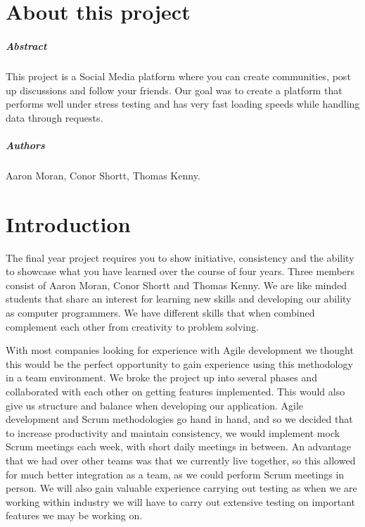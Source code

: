 
\chapter*{About this project}
\paragraph{Abstract}
This project is a Social Media platform where you can create communities, post up discussions and follow your friends. Our goal was to create a platform that performs well under stress testing and has very fast loading speeds while handling data through requests.

\paragraph{Authors}
Aaron Moran, Conor Shortt, Thomas Kenny.

\chapter{Introduction}
The final year project requires you to show initiative, consistency and the ability to showcase what you have learned over the course of four years.
Three members consist of Aaron Moran, Conor Shortt and Thomas Kenny. We are like minded students that share an interest for learning new skills and developing our ability as computer programmers. We have different skills that when combined complement each other from creativity to problem solving. 
\newline

With most companies looking for experience with Agile development we thought this would be the perfect opportunity to gain experience using this methodology in a team environment. We broke the project up into several phases and collaborated with each other on getting features implemented. This would also give us structure and balance when developing our application. Agile development and Scrum methodologies go hand in hand, and so we decided that to increase productivity and maintain consistency, we would implement mock Scrum meetings each week, with short daily meetings in between. An advantage that we had over other teams was that we currently live together, so this allowed for much better integration as a team, as we could perform Scrum meetings in person. We will also gain valuable experience carrying out testing as when we are working within industry we will have to carry out extensive testing on important features we may be working on.
\newline

